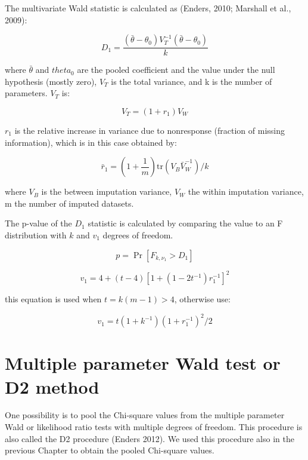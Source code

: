 \documentclass[]{book}
\begin{document}
The multivariate Wald statistic is calculated as (Enders, 2010; Marshall
et al., 2009):

\begin{equation}
  D_1 = \frac{ (\bar\theta - \theta_0)V_T^{-1} (\bar\theta - \theta_0) } {k}
  \label{eq:d1}
\end{equation}

where \(\bar\theta\) and \(theta_0\) are the pooled coefficient and the
value under the null hypothesis (mostly zero), \(V_T\) is the total
variance, and k is the number of parameters. \(V_T\) is:

\[V_T = (1+r_{1})V_W\]

\(r_1\) is the relative increase in variance due to nonresponse
(fraction of missing information), which is in this case obtained by:

\begin{equation}
\bar r_1 = \left(1+\frac{1}{m}\right)\mathrm{tr}(V_B\bar V_W^{-1})/k
\label{eq:r1}
\end{equation}

where \(V_B\) is the between imputation variance, \(V_W\) the within
imputation variance, m the number of imputed datasets.

The p-value of the \(D_1\) statistic is calculated by comparing the
value to an F distribution with \(k\) and \(v_1\) degrees of freedom.

\[p = \Pr[F_{k,\nu_1}>D_1]\]

\begin{equation}
v_1 = 4 + (t-4)[1+(1-2t^{-1})r_1^{-1}]^2
\label{eq:v1a}
\end{equation}

this equation is used when \(t = k(m-1) > 4\), otherwise use:

\begin{equation}
v_1 = t(1+k^{-1})(1+r_1^{-1})^2/2 
\label{eq:v1b}
\end{equation}

\section{Multiple parameter Wald test or D2
method}\label{multiple-parameter-wald-test-or-d2-method}

One possibility is to pool the Chi-square values from the multiple
parameter Wald or likelihood ratio tests with multiple degrees of
freedom. This procedure is also called the D2 procedure (Enders 2012).
We used this procedure also in the previous Chapter to obtain the pooled
Chi-square values.
\end{document}
